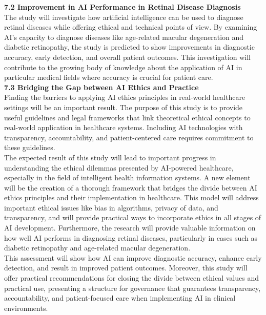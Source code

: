 \documentclass[a4paper, 12pt]{article}
\begin{document}
\textbf{7.2 \hspace{5mm} Improvement in AI Performance in Retinal Disease Diagnosis}\\
The study will investigate how artificial intelligence can be used to diagnose retinal diseases while offering ethical and technical points of view. By examining AI's capacity to diagnose diseases like age-related macular degeneration and diabetic retinopathy, the study is predicted to show improvements in diagnostic accuracy, early detection, and overall patient outcomes. This investigation will contribute to the growing body of knowledge about the application of AI in particular medical fields where accuracy is crucial for patient care.\\

\textbf{7.3 \hspace{5mm} Bridging the Gap between AI Ethics and Practice}\\
Finding the barriers to applying AI ethics principles in real-world healthcare settings will be an important result. The purpose of this study is to provide useful guidelines and legal frameworks that link theoretical ethical concepts to real-world application in healthcare systems. Including AI technologies with transparency, accountability, and patient-centered care requires commitment to these guidelines.\\

The expected result of this study will lead to important progress in understanding the ethical dilemmas presented by AI-powered healthcare, especially in the field of intelligent health information systems. A new element will be the creation of a thorough framework that bridges the divide between AI ethics principles and their implementation in healthcare. This model will address important ethical issues like bias in algorithms, privacy of data, and transparency, and will provide practical ways to incorporate ethics in all stages of AI development. Furthermore, the research will provide valuable information on how well AI performs in diagnosing retinal diseases, particularly in cases such as diabetic retinopathy and age-related macular degeneration.\\

This assessment will show how AI can improve diagnostic accuracy, enhance early detection, and result in improved patient outcomes. Moreover, this study will offer practical recommendations for closing the divide between ethical values and practical use, presenting a structure for governance that guarantees transparency, accountability, and patient-focused care when implementing AI in clinical environments.\\
\end{document}

